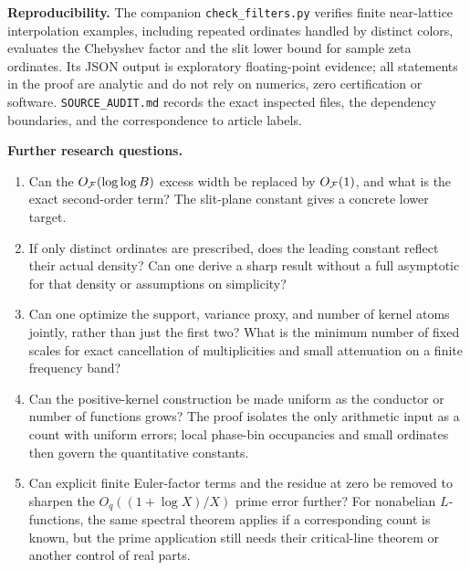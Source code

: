 \documentclass[11pt]{article}
\theoremstyle{definition}\newtheorem{definition}[theorem]{Definition}
\begin{document}
\textbf{Reproducibility.} The companion \texttt{check\_filters.py} verifies finite near-lattice interpolation examples, including repeated ordinates handled by distinct colors, evaluates the Chebyshev factor and the slit lower bound for sample zeta ordinates. Its JSON output is exploratory floating-point evidence; all statements in the proof are analytic and do not rely on numerics, zero certification or software. \texttt{SOURCE\_AUDIT.md} records the exact inspected files, the dependency boundaries, and the correspondence to article labels.

\textbf{Further research questions.}
\begin{enumerate}
\item Can the $O_{\mathcal F}(\log\log B)$ excess width be replaced by $O_{\mathcal F}(1)$, and what is the exact second-order term? The slit-plane constant gives a concrete lower target.
\item If only distinct ordinates are prescribed, does the leading constant reflect their actual density? Can one derive a sharp result without a full asymptotic for that density or assumptions on simplicity?
\item Can one optimize the support, variance proxy, and number of kernel atoms jointly, rather than just the first two? What is the minimum number of fixed scales for exact cancellation of multiplicities and small attenuation on a finite frequency band?
\item Can the positive-kernel construction be made uniform as the conductor or number of functions grows? The proof isolates the only arithmetic input as a count with uniform errors; local phase-bin occupancies and small ordinates then govern the quantitative constants.
\item Can explicit finite Euler-factor terms and the residue at zero be removed to sharpen the $O_q((1+\log X)/X)$ prime error further? For nonabelian $L$-functions, the same spectral theorem applies if a corresponding count is known, but the prime application still needs their critical-line theorem or another control of real parts.
\end{enumerate}
\end{document}

